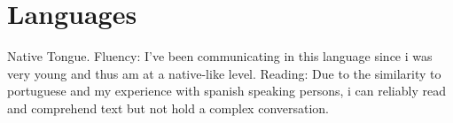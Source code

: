 \section{Languages}
{Native Tongue.}
{Fluency: I've been communicating in this language since i was very young and thus am at a native-like level.}
{Reading: Due to the similarity to portuguese and my experience with spanish speaking persons, i can reliably read and comprehend text but not hold a complex conversation.}
